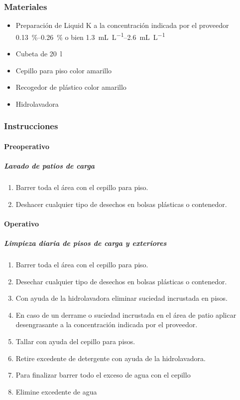 \subsubsection{Materiales}

\begin{itemize}
	\item Preparación de Liquid K a la concentración indicada por el proveedor \qtyrange{0.13}{0.26}{\percent} o bien \qtyrange{1.3}{2.6}{\milli\liter\per\liter}
	\item Cubeta de \qty{20}{\litre}
	\item Cepillo para piso color amarillo
	\item Recogedor de plástico color amarillo
	\item Hidrolavadora
\end{itemize}

\subsubsection{Instrucciones}

\paragraph{Preoperativo}

\subparagraph{Lavado de patios de carga}

\begin{enumerate}
	\item Barrer toda el área con el cepillo para piso.
	\item Deshacer cualquier tipo de desechos en bolsas plásticas o contenedor.
\end{enumerate}

\paragraph{Operativo}

\subparagraph{Limpieza diaria de pisos de carga y exteriores}

\begin{enumerate}
	\item Barrer toda el área con el cepillo para piso.
	\item Desechar cualquier tipo de desechos en bolsas plásticas o contenedor.
	\item Con ayuda de la hidrolavadora eliminar suciedad incrustada en pisos.
	\item En caso de un derrame o suciedad incrustada en el área de patio aplicar desengrasante a la concentración indicada por el proveedor.
	\item Tallar con ayuda del cepillo para pisos.
	\item Retire excedente de detergente con ayuda de la hidrolavadora.
	\item Para finalizar barrer todo el exceso de agua con el cepillo
	\item Elimine excedente de agua
\end{enumerate}


